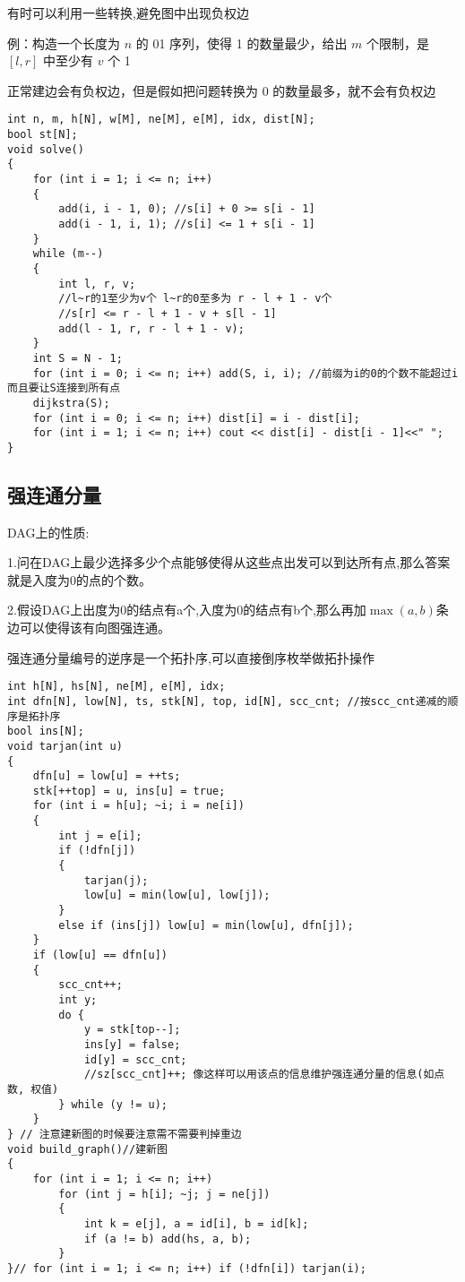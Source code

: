 \documentclass[a4paper, fontset=none]{ctexart}
\begin{document}
有时可以利用一些转换,避免图中出现负权边

例：构造一个长度为 $n$ 的 01 序列，使得 1 的数量最少，给出 $m$ 个限制，是 $[l, r]$ 中至少有 $v$ 个 1

正常建边会有负权边，但是假如把问题转换为 0 的数量最多，就不会有负权边

\begin{verbatim}
int n, m, h[N], w[M], ne[M], e[M], idx, dist[N];
bool st[N];
void solve()
{
    for (int i = 1; i <= n; i++)
    {
        add(i, i - 1, 0); //s[i] + 0 >= s[i - 1]
        add(i - 1, i, 1); //s[i] <= 1 + s[i - 1]
    }
    while (m--)
    {
        int l, r, v;
        //l~r的1至少为v个 l~r的0至多为 r - l + 1 - v个
        //s[r] <= r - l + 1 - v + s[l - 1]
        add(l - 1, r, r - l + 1 - v);
    }
    int S = N - 1;
    for (int i = 0; i <= n; i++) add(S, i, i); //前缀为i的0的个数不能超过i 而且要让S连接到所有点
    dijkstra(S);
    for (int i = 0; i <= n; i++) dist[i] = i - dist[i];
    for (int i = 1; i <= n; i++) cout << dist[i] - dist[i - 1]<<" ";
}
\end{verbatim}
\subsection{强连通分量}

DAG上的性质:

1.问在DAG上最少选择多少个点能够使得从这些点出发可以到达所有点,那么答案就是入度为0的点的个数。

2.假设DAG上出度为0的结点有a个,入度为0的结点有b个,那么再加$\max(a, b)$条边可以使得该有向图强连通。

强连通分量编号的逆序是一个拓扑序,可以直接倒序枚举做拓扑操作

\begin{verbatim}
int h[N], hs[N], ne[M], e[M], idx;
int dfn[N], low[N], ts, stk[N], top, id[N], scc_cnt; //按scc_cnt递减的顺序是拓扑序
bool ins[N];
void tarjan(int u)
{
    dfn[u] = low[u] = ++ts;
    stk[++top] = u, ins[u] = true;
    for (int i = h[u]; ~i; i = ne[i])
    {
        int j = e[i];
        if (!dfn[j])
        {
            tarjan(j);
            low[u] = min(low[u], low[j]);
        }
        else if (ins[j]) low[u] = min(low[u], dfn[j]);
    }
    if (low[u] == dfn[u])
    {
        scc_cnt++;
        int y;
        do {
            y = stk[top--];
            ins[y] = false;
            id[y] = scc_cnt;
            //sz[scc_cnt]++; 像这样可以用该点的信息维护强连通分量的信息(如点数, 权值)
        } while (y != u);
    }
} // 注意建新图的时候要注意需不需要判掉重边
void build_graph()//建新图
{
    for (int i = 1; i <= n; i++)
        for (int j = h[i]; ~j; j = ne[j])
        {
            int k = e[j], a = id[i], b = id[k];
            if (a != b) add(hs, a, b);
        }
}// for (int i = 1; i <= n; i++) if (!dfn[i]) tarjan(i);
\end{verbatim}
\end{document}
